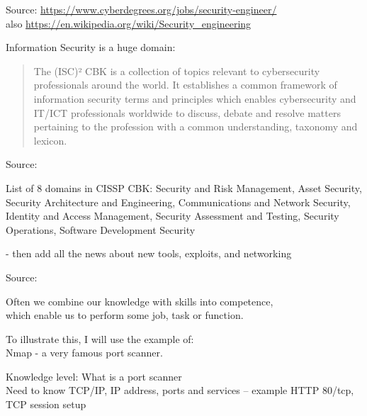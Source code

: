 \documentclass[Screen16to9,17pt]{foils}
\begin{document}
Source: \url{https://www.cyberdegrees.org/jobs/security-engineer/}\\
also
\url{https://en.wikipedia.org/wiki/Security_engineering}




Information Security is a huge domain:

\begin{quote}
The (ISC)² CBK is a collection of topics relevant to cybersecurity professionals around the world. It establishes a common framework of information security terms and principles which enables cybersecurity and IT/ICT professionals worldwide to discuss, debate and resolve matters pertaining to the profession with a common understanding, taxonomy and lexicon.
\end{quote}
Source: 

List of 8 domains in CISSP CBK: Security and Risk Management, Asset Security,
Security Architecture and Engineering, Communications and Network Security, Identity and Access Management, Security Assessment and Testing, Security Operations, Software Development Security

- then add all the news about new tools, exploits, and networking


Source: 








{\Large Often we combine our knowledge with skills into competence, \\
which enable us to perform some job, task or function.}

To illustrate this, I will use the example of:\\
Nmap - a very famous port scanner.


\begin{list2}
\item Knowledge level: What is a port scanner\\
Need to know TCP/IP, IP address, ports and services -- example HTTP 80/tcp, TCP session setup
\end{list2}
\end{document}
